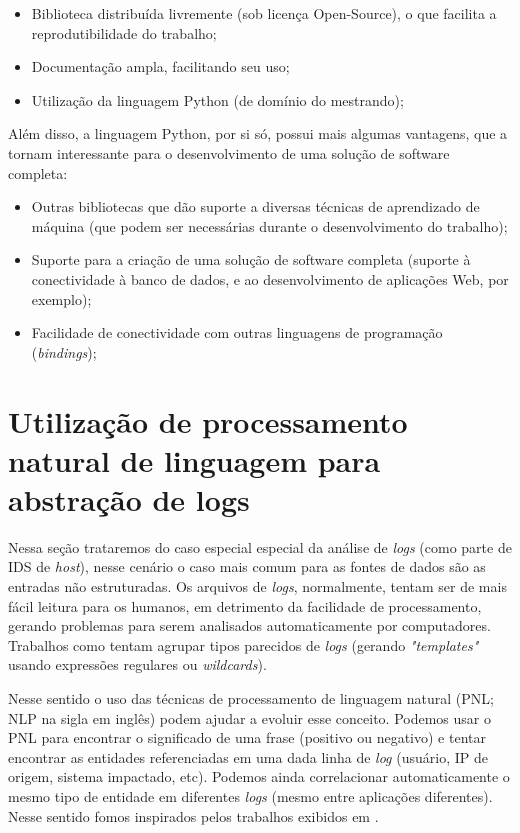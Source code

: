 \documentclass[
	12pt,				%
	openright,			%
	twoside,			%
	a4paper,			%
	english,			%
	french,				%
	spanish,			%
	brazil,				%
	]{abntex2}
\begin{document}
\begin{itemize}
	\item Biblioteca distribuída livremente (sob licença Open-Source), o que facilita a reprodutibilidade do trabalho;
	\item Documentação ampla, facilitando seu uso;
	\item Utilização da linguagem Python (de domínio do mestrando);
\end{itemize}

Além disso, a linguagem Python, por si só, possui mais algumas vantagens, que a tornam interessante para o desenvolvimento de uma solução de software completa:
\begin{itemize}
	\item Outras bibliotecas que dão suporte a diversas técnicas de aprendizado de máquina (que podem ser necessárias durante o desenvolvimento do trabalho);
	\item Suporte para a criação de uma solução de software completa (suporte à conectividade à banco de dados, e ao desenvolvimento de aplicações Web, por exemplo);
	\item Facilidade de conectividade com outras linguagens de programação (\emph{bindings});
\end{itemize}

\chapter{Utilização de processamento natural de linguagem para abstração de logs}\label{chap:proposta}

Nessa seção trataremos do caso especial especial da análise de \emph{logs} (como parte de IDS de \emph{host}), nesse cenário o caso mais comum para as fontes de dados são as entradas não estruturadas. Os arquivos de \emph{logs}, normalmente, tentam ser de mais fácil leitura para os humanos, em detrimento da facilidade de processamento, gerando problemas para serem analisados automaticamente por computadores. Trabalhos como \cite{vaarandi2003data, nagappan2010abstracting} tentam agrupar tipos parecidos de \emph{logs} (gerando \emph{"templates"} usando expressões regulares ou \emph{wildcards}).

Nesse sentido o uso das técnicas de processamento de linguagem natural (PNL; NLP na sigla em inglês) podem ajudar a evoluir esse conceito. Podemos usar o PNL para encontrar o significado de uma frase (positivo ou negativo) e tentar encontrar as entidades referenciadas em uma dada linha de \emph{log} (usuário, IP de origem, sistema impactado, etc). Podemos ainda correlacionar automaticamente o mesmo tipo de entidade em diferentes \emph{logs} (mesmo entre aplicações diferentes).  Nesse sentido fomos inspirados pelos trabalhos exibidos em \cite{matos2010environment, duque2012processo}.
\end{document}
